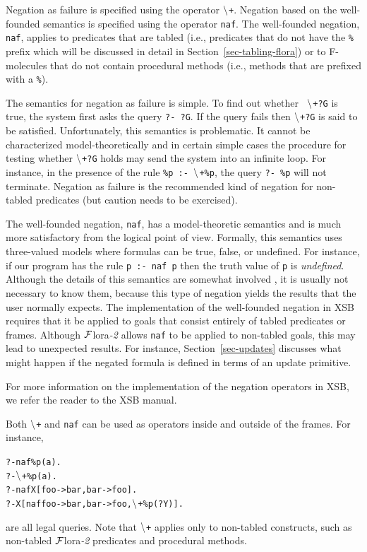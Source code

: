 \documentclass[11pt]{article}
\newcommand{\FLORA}{{\mbox{\sc ${\cal F}${lora}\rm\emph{-2}}}\xspace}
\newcommand{\PLGNAF}{\mbox{\tt \ensuremath{\tt\backslash}+}\xspace}
\newcommand{\RULELOGNAF}{{{\tt naf}}\xspace}
\begin{document}
Negation as failure is specified using the operator \PLGNAF.
Negation based on the well-founded semantics is specified using the
operator \RULELOGNAF.  The well-founded negation, \RULELOGNAF, applies to predicates
that are tabled (i.e., predicates that do not have the {\tt \%} prefix
which will be discussed in detail in Section~\ref{sec-tabling-flora}) or
to F-molecules that do not contain procedural methods (i.e., methods that
are prefixed with a {\tt \%}).

The semantics for negation as failure is simple. To find out whether {\tt
  \PLGNAF ?G} is true, the system first asks the query {\tt ?- ?G}. If the query
fails then {\tt \PLGNAF ?G} is said to be satisfied. Unfortunately, this
semantics is problematic. It cannot be characterized model-theoretically
and in certain simple cases the procedure for testing whether {\tt \PLGNAF ?G}
holds may send the system into an infinite loop. For instance, in the
presence of the rule {\tt \%p :- \PLGNAF \%p}, the query {\tt ?- \%p} will not
terminate.  Negation as failure is the recommended kind of negation for
non-tabled predicates (but caution needs to be exercised).

The well-founded negation, \RULELOGNAF, has a model-theoretic semantics and is
much more
satisfactory from the logical point of view.
Formally, this semantics uses three-valued models where formulas can be
true, false, or undefined. For instance, if our program has the rule
{\tt p :- \RULELOGNAF p} then the truth value of {\tt p} is \emph{undefined}.  
Although the details of this
semantics are somewhat involved \cite{gelder-ross-schlipf-91}, it is
usually not necessary to know them, because this type of negation yields
the results that the user normally expects. The implementation of
the well-founded negation in XSB requires that it be applied to goals that
consist entirely of tabled predicates or frames.
Although \FLORA allows \RULELOGNAF to be applied to non-tabled goals,
this may lead to unexpected results.  For instance, 
Section~\ref{sec-updates} discusses what might happen if the
negated formula is defined in terms of an update primitive.

For more information on the implementation of the negation operators in
XSB, we refer the reader to the XSB manual.

Both \PLGNAF and \RULELOGNAF can be used as operators inside and outside of
the frames. For instance,
\begin{alltt}
       ?- \RULELOGNAF \%p(a).
       ?- \PLGNAF \%p(a).
       ?- \RULELOGNAF X[foo->bar, bar->foo].
       ?- X[\RULELOGNAF foo->bar, bar->foo, \PLGNAF \%p(?Y)].
\end{alltt}
are all legal queries. Note that \PLGNAF applies only to non-tabled
constructs, such as non-tabled \FLORA predicates and procedural methods.
\end{document}
